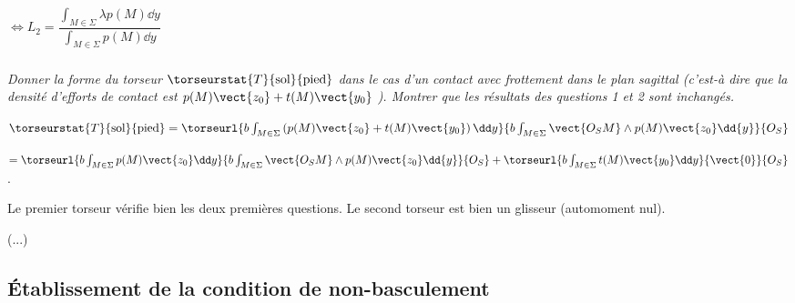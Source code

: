 \begin{multicols}{2}
\begin{corrige}
$\Leftrightarrow L_2 =  \dfrac{\int_{M\in\Sigma} \lambda  p(M)\dd {y} }{ \int_{M\in\Sigma} p(M) \dd y}  $

%
%
%
%
%
%

\end{corrige}
\else
\fi



\subparagraph{} \textit{Donner la forme du torseur $\torseurstat{T}{\text{sol}}{\text{pied}}$ dans le cas d'un contact avec frottement dans le plan sagittal (c'est-à dire que la densité d'efforts de contact est $p(M)\vect{z_0}+t(M)\vect{y_0}$ ). Montrer que les résultats des questions 1 et 2 sont inchangés.}
\ifprof
\begin{corrige}
$
\torseurstat{T}{\text{sol}}{\text{pied}}=\torseurl{b\int_{M\in\Sigma}\left(p(M)\vect{z_0}+t(M)\vect{y_0}\right) \dd y }{b\int_{M\in\Sigma} \vect{O_S M} \wedge p(M)\vect{z_0} \dd {y}}{O_S}$

$=\torseurl{b\int_{M\in\Sigma}p(M)\vect{z_0}\dd y }{b\int_{M\in\Sigma} \vect{O_S M} \wedge p(M)\vect{z_0} \dd {y}}{O_S}+\torseurl{b\int_{M\in\Sigma}t(M)\vect{y_0}\dd y }{\vect{0}}{O_S}$.

Le premier torseur vérifie bien les deux premières questions. Le second torseur est bien un glisseur (automoment nul). 

(...)


\end{corrige}
\else
\fi

\subsection*{Établissement de la condition de non-basculement}
\ifprof
\else


\end{multicols}
